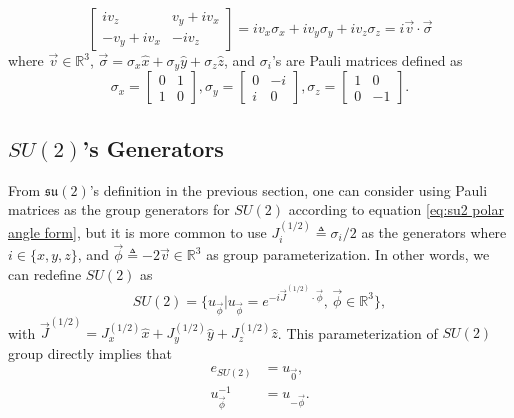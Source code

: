 \documentclass[preprint, 12pt]{revtex4-2}
\numberwithin{equation}{section}
\begin{document}
\begin{equation}\label{eq:su2 polar angle form}
    \begin{bmatrix}
        iv_z & v_y+iv_x \\
        -v_y+iv_x & -iv_z
    \end{bmatrix}
      = iv_x\sigma_x + iv_y\sigma_y + iv_z\sigma_z = i\vec{v}\cdot\vec{\sigma}
\end{equation}
where $\vec{v} \in \mathbb{R}^3$, $\vec{\sigma}=\sigma_x\hat{x}+\sigma_y\hat{y}+\sigma_z\hat{z}$, and $\sigma_i$'s are Pauli matrices defined as
\begin{equation}\label{eq:Pauli's matrices}
    \sigma_x = \begin{bmatrix}
                    0 & 1 \\
                    1 & 0
                \end{bmatrix},
    \sigma_y = \begin{bmatrix}
                    0 & -i \\
                    i & 0
                \end{bmatrix},
    \sigma_z = \begin{bmatrix}
                    1 & 0 \\
                    0 & -1
                \end{bmatrix}.
\end{equation}

\subsection{$SU(2)$'s Generators}
From $\mathfrak{su(2)}$'s definition in the previous section, one can consider using Pauli matrices as the group generators for $SU(2)$ according to equation \ref{eq:su2 polar angle form}, but it is more common to use $J^{(1/2)}_i \triangleq \sigma_i/2$ as the generators where $i\in \{x, y, z\}$, and $\vec{\phi}\triangleq-2\vec{v}\in\mathbb{R}^3$ as group parameterization. In other words, we can redefine $SU(2)$ as
\begin{equation}\label{eq:SU2 parameterization}
    SU(2) = \{u_{\vec{\phi}}|u_{\vec{\phi}}=e^{-i\vec{J}^{(1/2)}\cdot\vec{\phi}},\, \vec{\phi}\in\mathbb{R}^3\},
\end{equation}
with $\vec{J}^{(1/2)}=J_x^{(1/2)}\hat{x}+J_y^{(1/2)}\hat{y}+J_z^{(1/2)}\hat{z}$. This parameterization of $SU(2)$ group directly implies that
\begin{equation}\label{eq:SU2 parameterization elements}
    \begin{aligned}
        e_{SU(2)} &= u_{\vec{0}}, \\
        u_{\vec{\phi}}^{-1} &= u_{-\vec{\phi}}.
    \end{aligned}
\end{equation}
\end{document}

